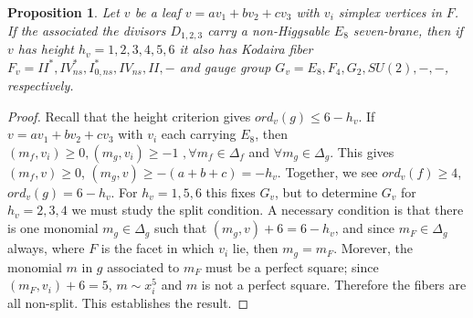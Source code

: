 \documentclass[aps,prl,twocolumn, superscriptaddress,groupedaddress,nofootinbib]{revtex4-1}
\newtheorem{prop}{Proposition}
\begin{document}
\begin{prop}
\label{prop:E8roots}
Let $v$ be a leaf $v=av_1 + bv_2 + cv_3$ with $v_i$ simplex vertices in $F$. If
the associated the divisors $D_{1,2,3}$
carry a non-Higgsable $E_8$ seven-brane, then if $v$ has height
 $h_v=1,2,3,4,5,6$ it also has Kodaira fiber $F_v=II^*,IV^*_{ns},I^*_{0,ns},IV_{ns},II,-$
and gauge group $G_v=E_8,F_4,G_2,SU(2),-,-$, respectively.
\end{prop}
\begin{proof}
Recall that the height criterion
gives $ord_v(g)\leq 6-h_v$. If $v=av_1+bv_2+cv_3$ with $v_i$ each carrying $E_8$,
then 
$(m_f,v_i)\geq 0, (m_g,v_i)\geq -1\,\,, \forall m_f\in \Delta_f 
$ and $\forall m_g\in \Delta_g$.
This gives $(m_f,v)\geq 0$, $(m_g,v)\geq-(a+b+c)= -h_v$. Together, we see
$ord_v(f)\geq 4$, $ord_v(g)=6-h_v$. For $h_v= 1,5,6$ this fixes $G_v$, but 
to determine $G_v$ for $h_v=2,3,4$ we must study the split condition. A necessary
condition is that there is one monomial $m_g\in \Delta_g$ such that $(m_g,v)+6=6-h_v$,
and since $m_F \in \Delta_g$ always, where $F$ is the facet in which $v_i$ lie,
then $m_g=m_F$. Morever, the monomial $m$ in $g$ associated to $m_F$ must be a perfect
square; since $(m_F,v_i)+6=5$, $m\sim x_i^5$ and $m$ is not a perfect square. 
Therefore the fibers are all non-split. This establishes the result.
\end{proof}
\end{document}
